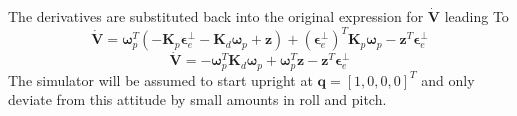 The derivatives are substituted back into the original expression for $\dot{\bm{V}}$ leading To
\begin{equation}
    \dot{\bm{V}}=\bm{\omega}_p^T(
    -\bm{K}_p\bm{\epsilon}_e^\perp - \bm{K}_d\bm{\omega}_p +\bm{z})
    + (\bm{\epsilon}_e^\perp)^T\bm{K}_p\bm{\omega}_p
    - \bm{z}^T\bm{\epsilon}_e^\perp
\end{equation}
\begin{equation}
    \dot{\bm{V}}=-\bm{\omega}_p^T\bm{K}_d\bm{\omega}_p + \bm{\omega}_p^T\bm{z}
    - \bm{z}^T\bm{\epsilon}_e^\perp
\end{equation}
The simulator will be assumed to start upright at $\bm{q} = [1, 0, 0, 0]^T$ and only deviate from this attitude by small amounts in roll and pitch. 